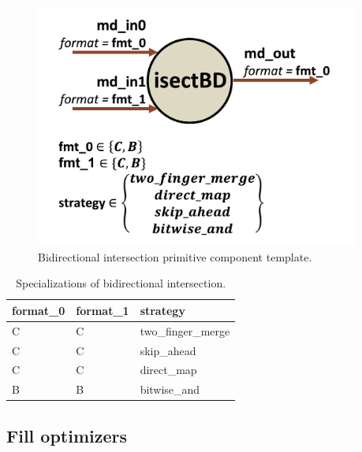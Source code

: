 \begin{figure}[H]
    \centering
    \includegraphics[width=0.95\textwidth]{figures/isectbd.png}
    \caption{Bidirectional intersection primitive component template.}
    \label{fig:isectbd}
\end{figure}

\begin{table}[H]
\centering
\begin{tabular}{lll}
\toprule
 format\_0   & format\_1   & strategy         \\
\midrule
 C          & C          & two\_finger\_merge \\
 C          & C          & skip\_ahead       \\
 C          & C          & direct\_map       \\
 B          & B          & bitwise\_and      \\
\bottomrule
\end{tabular}
\caption{Specializations of bidirectional intersection.}
\label{tab:IntersectionBidirectional_specializations}
\end{table}

\subsection{Fill optimizers}

